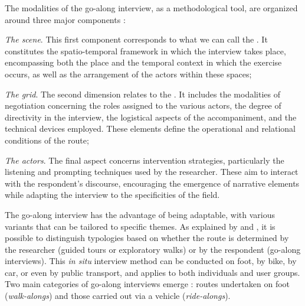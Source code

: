 \begin{refsegment}
The modalities of the go-along interview, as a methodological tool, are organized around three major components \textcolor{blue}{\autocites{blanchet_entretien_2015}[7]{despres_replacer_2019}}:
\begin{customitemize}
    \item \textsl{The scene}. This first component corresponds to what we can call the . It constitutes the spatio-temporal framework in which the interview takes place, encompassing both the place and the temporal context in which the exercise occurs, as well as the arrangement of the actors within these spaces;
    \item \textsl{The grid}. The second dimension relates to the . It includes the modalities of negotiation concerning the roles assigned to the various actors, the degree of directivity in the interview, the logistical aspects of the accompaniment, and the technical devices employed. These elements define the operational and relational conditions of the route;
    \item \textsl{The actors}. The final aspect concerns intervention strategies, particularly the listening and prompting techniques used by the researcher. These aim to interact with the respondent's discourse, encouraging the emergence of narrative elements while adapting the interview to the specificities of the field.
\end{customitemize}%

The go-along interview has the advantage of being adaptable, with various variants that can be tailored to specific themes. As explained by \textcolor{blue}{\textcite[850]{evans_walking_2011}} and \textcolor{blue}{\textcite[7]{wegerif_ride-along_2019}}, it is possible to distinguish typologies based on whether the route is determined by the researcher (guided tours or exploratory walks) or by the respondent (go-along interviews). This \textsl{in situ} interview method can be conducted on foot, by bike, by car, or even by public transport, and applies to both individuals and user groups. Two main categories of go-along interviews emerge \textcolor{blue}{\autocite[456]{kusenbach_street_2003}}: routes undertaken on foot (\textsl{walk-alongs}) and those carried out via a vehicle (\textsl{ride-alongs}).%


\end{refsegment}
